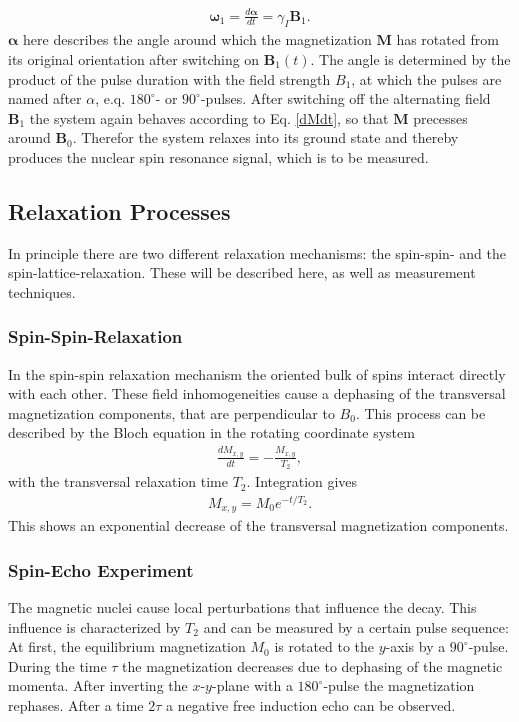 \documentclass[a4paper,10pt]{article}
\begin{document}
\begin{eqnarray}
 \mathbf{\omega}_1 = \frac{d\mathbf{\alpha}}{dt} = \gamma_I \mathbf{B}_1.
\end{eqnarray}
$\mathbf{\alpha}$ here describes the angle around which the magnetization $\mathbf{M}$ has rotated from its original orientation after switching on $\mathbf{B}_1(t)$. The angle is determined by the product of the pulse duration with the field strength $B_1$, at which the pulses are named after $\alpha$, e.q. $180^\circ$- or $90^\circ$-pulses.
After switching off the alternating field $\mathbf{B}_1$ the system again behaves according to Eq. \eqref{dMdt}, so that $\mathbf{M}$ precesses around $\mathbf{B}_0$. Therefor the system relaxes into its ground state and thereby produces the nuclear spin resonance signal, which is to be measured.




\subsection{Relaxation Processes}

In principle there are two different relaxation mechanisms: the spin-spin- and the spin-lattice-relaxation. These will be described here, as well as measurement techniques.

\subsubsection{Spin-Spin-Relaxation}
In the spin-spin relaxation mechanism the oriented bulk of spins interact directly with each other.  These field inhomogeneities cause a dephasing of the transversal magnetization components, that are perpendicular to $B_0$. This process can be described by the Bloch equation in the rotating coordinate system
\begin{eqnarray}
 \frac{dM_{x,y}}{dt} = -\frac{M_{x,y}}{T_2},
\end{eqnarray}
with the transversal relaxation time $T_2$. Integration gives
\begin{eqnarray}
 M_{x,y} = M_0 e^{-t/T_2}.
\end{eqnarray}
This shows an exponential decrease of the transversal magnetization components.

\subsubsection*{Spin-Echo Experiment}
The magnetic nuclei cause local perturbations that influence the decay. This influence is characterized by $T_2$ and can be measured by a certain pulse sequence: At first, the equilibrium magnetization  $M_0$ is rotated to the $y$-axis by a $90^\circ$-pulse. During the time $\tau$ the magnetization decreases due to dephasing of the magnetic momenta. After inverting the $x$-$y$-plane with a $180^\circ$-pulse the magnetization rephases. After a time $2\tau$ a negative free induction echo can be observed. 
\end{document}
